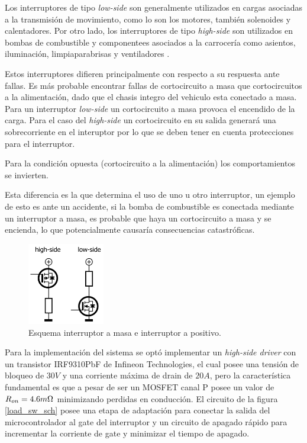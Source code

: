 \documentclass[10pt,a4paper]{article}
\begin{document}
Los interruptores de tipo \emph{low-side} son generalmente utilizados en cargas
asociadas a la transmisión de movimiento, como lo son los motores, también
solenoides y calentadores. Por otro lado, los interruptores de tipo
\emph{high-side} son utilizados en bombas de combustible y componentees
asociados a la carrocería como asientos, iluminación, limpiaparabrisas y
ventiladores \cite{DigKey2016}.

Estos interruptores difieren principalmente con respecto a su respuesta ante
fallas. Es más probable encontrar fallas de cortocircuito a masa que
cortocircuitos a la alimentación, dado que el chasis integro del vehiculo esta
conectado a masa. Para un interruptor \emph{low-side} un cortocircuito a masa
provoca el encendido de la carga. Para el caso del \emph{high-side} un
cortocircuito en su salida generará una sobrecorriente en el interuptor por lo
que se deben tener en cuenta protecciones para el interruptor.

Para la condición opuesta (cortocircuito a la alimentación) los comportamientos
se invierten.

Esta diferencia es la que determina el uso de uno u otro interruptor, un ejemplo
de esto es ante un accidente, si la bomba de combustible es conectada mediante
un interruptor a masa, es probable que haya un cortocircuito a masa y se
encienda, lo que potencialmente causaría consecuencias catastróficas.

\begin{figure}[h!]
	\begin{center}
		\includegraphics[width=0.30\textwidth]{low_high_driver_sch.png}
		\caption{Esquema interruptor a masa e interruptor a positivo.}
		\label{low_high_driver_sch}
	\end{center}
\end{figure}
\FloatBarrier

Para la implementación del sistema se optó implementar un \emph{high-side
driver} con un transistor IRF9310PbF de Infineon Technologies, el cual posee una
tensión de bloqueo de $30V$ y una corriente máxima de drain de $20A$, pero la
característica fundamental es que a pesar de ser un MOSFET canal P posee un
valor de $R_{on}=4.6 m\ohm$ minimizando perdidas en conducción. El circuito de
la figura \ref{load_sw_sch} posee una etapa de adaptación para conectar la
salida del microcontrolador al gate del interruptor y un circuito de apagado
rápido para incrementar la corriente de gate y minimizar el tiempo de apagado.
\end{document}
